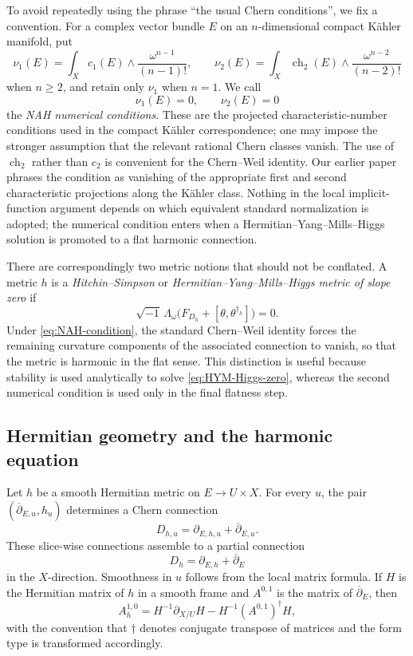 \documentclass[11pt,reqno]{amsart}
\theoremstyle{definition}
\theoremstyle{remark}
\newcommand{\ddbar}{\overline\partial}
\begin{document}
To avoid repeatedly using the phrase ``the usual Chern conditions'', we fix a convention.  For a complex vector bundle $E$ on an $n$-dimensional compact K\"ahler manifold, put
\begin{equation}\label{eq:NAH-numerical}
  \nu_1(E)=\int_X c_1(E)\wedge\frac{\omega^{n-1}}{(n-1)!},
  \qquad
  \nu_2(E)=\int_X \operatorname{ch}_2(E)\wedge\frac{\omega^{n-2}}{(n-2)!}
\end{equation}
when $n\ge2$, and retain only $\nu_1$ when $n=1$.  We call
\begin{equation}\label{eq:NAH-condition}
  \nu_1(E)=0,
  \qquad
  \nu_2(E)=0
\end{equation}
the \emph{NAH numerical conditions}.  These are the projected characteristic-number conditions used in the compact K\"ahler correspondence; one may impose the stronger assumption that the relevant rational Chern classes vanish.  The use of $\operatorname{ch}_2$ rather than $c_2$ is convenient for the Chern--Weil identity.  Our earlier paper \cite{AzamRayan2026} phrases the condition as vanishing of the appropriate first and second characteristic projections along the K\"ahler class.  Nothing in the local implicit-function argument depends on which equivalent standard normalization is adopted; the numerical condition enters when a Hermitian--Yang--Mills--Higgs solution is promoted to a flat harmonic connection.

There are correspondingly two metric notions that should not be conflated.  A metric $h$ is a \emph{Hitchin--Simpson} or \emph{Hermitian--Yang--Mills--Higgs metric of slope zero} if
\begin{equation}\label{eq:HYM-Higgs-zero}
  \sqrt{-1}\,\Lambda_\omega
  \bigl(F_{D_h}+[\theta,\theta^{\dagger_h}]\bigr)=0.
\end{equation}
Under \eqref{eq:NAH-condition}, the standard Chern--Weil identity forces the remaining curvature components of the associated connection to vanish, so that the metric is harmonic in the flat sense.  This distinction is useful because stability is used analytically to solve \eqref{eq:HYM-Higgs-zero}, whereas the second numerical condition is used only in the final flatness step.

\subsection{Hermitian geometry and the harmonic equation}

Let $h$ be a smooth Hermitian metric on $E\to U\times X$.  For every $u$, the pair $(\ddbar_{E,u},h_u)$ determines a Chern connection
\[
  D_{h,u}=\partial_{E,h,u}+\ddbar_{E,u}.
\]
These slice-wise connections assemble to a partial connection
\[
  D_h=\partial_{E,h}+\ddbar_E
\]
in the $X$-direction.  Smoothness in $u$ follows from the local matrix formula.  If $H$ is the Hermitian matrix of $h$ in a smooth frame and $A^{0,1}$ is the matrix of $\ddbar_E$, then
\begin{equation}\label{eq:chern-matrix}
  A^{1,0}_h
  =H^{-1}\partial_{X/U}H-H^{-1}(A^{0,1})^{\dagger}H,
\end{equation}
with the convention that $\dagger$ denotes conjugate transpose of matrices and the form type is transformed accordingly.
\end{document}
